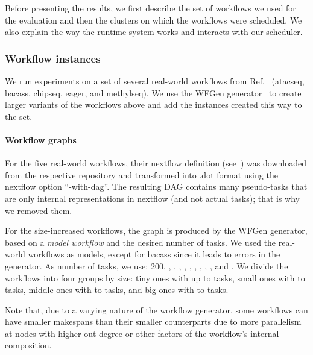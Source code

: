 \documentclass[conference]{IEEEtran}
\newcommand{\new}[1]{{\color{blue}#1}}
\begin{document}
Before presenting the results, we first describe the set of workflows we used for the evaluation and
then the clusters on which the workflows were scheduled.
We also explain the way the runtime system works and interacts with our scheduler. 

\subsubsection{Workflow instances}
We run experiments on a set of several real-world workflows from Ref.~\cite{lotaru}
(atacseq, bacass, chipseq, eager, and methylseq). We use the WFGen generator~\cite{COLEMAN202216} to
create larger variants of the workflows above and add the instances created this way to the set.


\paragraph{Workflow graphs}
For the five real-world workflows, their nextflow definition (see~\cite{ewels2020nf}) was downloaded from the
respective repository and transformed into .dot format using the nextflow option ``-with-dag''.
The resulting DAG contains many pseudo-tasks that are only internal representations in nextflow
(and not actual tasks); that is why we removed them.

For the size-increased workflows, the graph is produced by the WFGen generator, based on a {\em model workflow} and
the desired number of tasks.
We used the real-world workflows as models, except for bacass since it leads to errors in the generator.
%
As number of tasks, we use: 200, , , , , ,
, , , , and .
We divide the workflows into four groups by size: tiny ones with up to  tasks, small ones with  to  tasks,
middle ones with  to  tasks, and big ones with  to  tasks.

\new{Note that, due to a varying nature of the workflow generator, some workflows can have smaller makespans than their
smaller counterparts due to more parallelism at nodes with higher out-degree or other factors of the workflow's
internal composition.}
\end{document}
